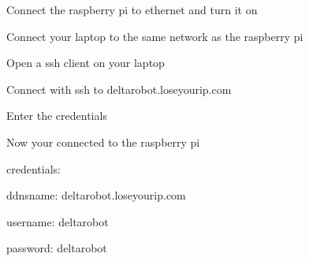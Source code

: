 
\begin{DoxyEnumerate}
\item Connect the raspberry pi to ethernet and turn it on
\item Connect your laptop to the same network as the raspberry pi
\item Open a ssh client on your laptop
\item Connect with ssh to deltarobot.\+loseyourip.\+com
\item Enter the credentials
\item Now your connected to the raspberry pi
\end{DoxyEnumerate}

credentials\+:
\begin{DoxyItemize}
\item ddnsname\+: {\ttfamily deltarobot.\+loseyourip.\+com}
\item username\+: {\ttfamily deltarobot}
\item password\+: {\ttfamily deltarobot} 
\end{DoxyItemize}
